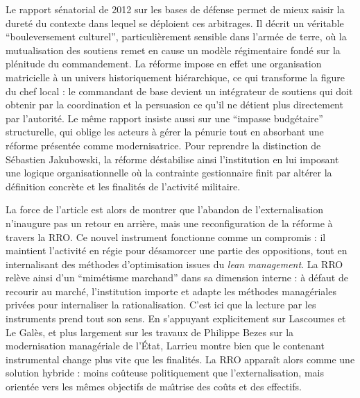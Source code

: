 \documentclass[12pt,a4paper]{article}
\begin{document}
Le rapport s\'enatorial de 2012 sur les bases de d\'efense permet de mieux saisir la duret\'e du contexte dans lequel se d\'eploient ces arbitrages. Il d\'ecrit un v\'eritable ``bouleversement culturel'', particuli\`erement sensible dans l'arm\'ee de terre, o\`u la mutualisation des soutiens remet en cause un mod\`ele r\'egimentaire fond\'e sur la pl\'enitude du commandement. La r\'eforme impose en effet une organisation matricielle \`a un univers historiquement hi\'erarchique, ce qui transforme la figure du chef local : le commandant de base devient un int\'egrateur de soutiens qui doit obtenir par la coordination et la persuasion ce qu'il ne d\'etient plus directement par l'autorit\'e. Le m\^eme rapport insiste aussi sur une ``impasse budg\'etaire'' structurelle, qui oblige les acteurs \`a g\'erer la p\'enurie tout en absorbant une r\'eforme pr\'esent\'ee comme modernisatrice. Pour reprendre la distinction de S\'ebastien Jakubowski, la r\'eforme d\'estabilise ainsi l'institution en lui imposant une logique organisationnelle o\`u la contrainte gestionnaire finit par alt\'erer la d\'efinition concr\`ete et les finalit\'es de l'activit\'e militaire.

La force de l'article est alors de montrer que l'abandon de l'externalisation n'inaugure pas un retour en arri\`ere, mais une reconfiguration de la r\'eforme \`a travers la RRO. Ce nouvel instrument fonctionne comme un compromis : il maintient l'activit\'e en r\'egie pour d\'esamorcer une partie des oppositions, tout en internalisant des m\'ethodes d'optimisation issues du \emph{lean management}. La RRO rel\`eve ainsi d'un ``mim\'etisme marchand'' dans sa dimension interne : \`a d\'efaut de recourir au march\'e, l'institution importe et adapte les m\'ethodes manag\'eriales priv\'ees pour internaliser la rationalisation. C'est ici que la lecture par les instruments prend tout son sens. En s'appuyant explicitement sur Lascoumes et Le Gal\`es, et plus largement sur les travaux de Philippe Bezes sur la modernisation manag\'eriale de l'\'Etat, Larrieu montre bien que le contenant instrumental change plus vite que les finalit\'es. La RRO appara\^it alors comme une solution hybride : moins co\^uteuse politiquement que l'externalisation, mais orient\'ee vers les m\^emes objectifs de ma\^\i trise des co\^uts et des effectifs.
\end{document}

